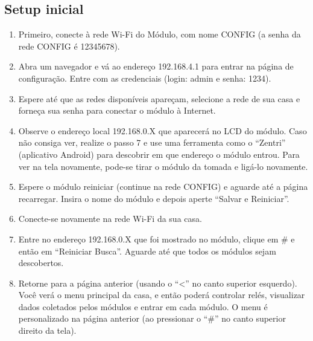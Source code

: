 \subsection{Setup inicial}
\begin{enumerate}
	\item Primeiro, conecte à rede Wi-Fi do Módulo, com nome CONFIG (a senha da rede CONFIG é 12345678).
	\item Abra um navegador e vá ao endereço 192.168.4.1 para entrar na página de configuração. Entre com as credenciais (login: admin e senha: 1234).
	\item Espere até que as redes disponíveis apareçam, selecione a rede de sua casa e forneça sua senha para conectar o módulo à Internet.
	\item Observe o endereço local 192.168.0.X que aparecerá no LCD do módulo. Caso não consiga ver, realize o passo 7 e use uma ferramenta como o “Zentri” (aplicativo Android) para descobrir em que endereço o módulo entrou. Para ver na tela novamente, pode-se tirar o módulo da tomada e ligá-lo novamente.
	\item Espere o módulo reiniciar (continue na rede CONFIG) e aguarde até a página recarregar. Insira o nome do módulo e depois aperte “Salvar e Reiniciar”.
	\item Conecte-se novamente na rede Wi-Fi da sua casa.
	\item Entre no endereço 192.168.0.X que foi mostrado no módulo, clique em \# e então em “Reiniciar Busca”. Aguarde até que todos os módulos sejam descobertos.
	\item Retorne para a página anterior (usando o “<” no canto superior esquerdo). Você verá o menu principal da casa, e então poderá controlar relés, visualizar dados coletados pelos módulos e entrar em cada módulo. O menu é personalizado na página anterior (ao pressionar o “\#” no canto superior direito da tela).
\end{enumerate}
